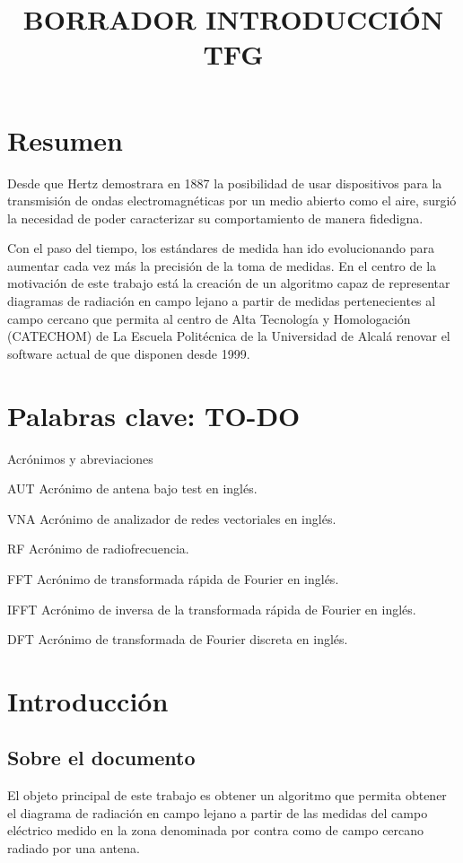 \documentclass{article}
\begin{document}
\title{BORRADOR INTRODUCCIÓN TFG}

\tableofcontents
\newpage

\section{Resumen}

Desde que Hertz demostrara en 1887 la posibilidad de usar dispositivos para la transmisión de ondas electromagnéticas por un medio abierto como el aire, surgió la necesidad de poder caracterizar su comportamiento de manera fidedigna.

Con el paso del tiempo, los estándares de medida han ido evolucionando para aumentar cada vez más la precisión de la toma de medidas.  En el centro de la motivación de este trabajo está la creación de un algoritmo capaz de representar diagramas de radiación en campo lejano a partir de medidas pertenecientes al campo cercano que permita al centro de Alta Tecnología y Homologación (CATECHOM) de La Escuela Politécnica de la Universidad de Alcalá renovar el software actual de que disponen desde 1999.


\newpage

\section{Palabras clave: TO-DO} 

Acrónimos y abreviaciones 

AUT Acrónimo de antena bajo test en inglés. 

VNA Acrónimo de analizador de redes vectoriales en inglés. 

RF Acrónimo de radiofrecuencia.

FFT Acrónimo de transformada rápida de Fourier en inglés.

IFFT Acrónimo de inversa de la transformada rápida de Fourier en inglés.

DFT Acrónimo de transformada de Fourier discreta en inglés.

\newpage

\section{Introducción}
\subsection{Sobre el documento} 

El objeto principal de este trabajo es obtener un algoritmo que permita obtener
el diagrama de radiación en campo lejano a partir de las medidas del campo
eléctrico medido en la zona denominada por contra como de campo cercano
radiado por una antena.
\\
\end{document}
